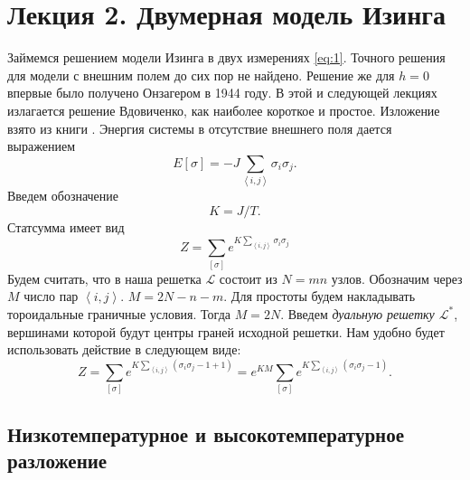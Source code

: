 \documentclass[a4paper,12pt]{article}
\theoremstyle{definition}
\theoremstyle{definition}
\theoremstyle{definition}
\begin{document}
\section{Лекция 2. Двумерная модель Изинга}
\label{sec:lecture-5}

Займемся решением модели Изинга в двух измерениях \eqref{eq:1}. Точного решения для модели с внешним
полем до сих пор не найдено. Решение же для $h=0$ впервые было получено Онзагером в 1944 году. В
этой и следующей лекциях излагается решение Вдовиченко, как наиболее короткое и простое. Изложение
взято из книги \cite{belavin2001lect}. 
Энергия системы в отсутствие внешнего поля дается выражением
\begin{equation}
  \label{eq:98}
  E[\sigma]=-J\sum_{\left<i,j\right>}\sigma_i \sigma_j .
\end{equation}
Введем обозначение
\begin{equation}
  \label{eq:99}
  K=J/T.
\end{equation}
Статсумма имеет вид
\begin{equation}
  \label{eq:100}
  Z=\sum_{[\sigma]}e^{K\sum_{\left<i,j\right>}\sigma_i\sigma_j}
\end{equation}
Будем считать, что в наша решетка $\mathcal{L}$ состоит из $N=mn$ узлов. Обозначим через $M$ число
пар $\left<i,j\right>$. $M=2N-n-m$. Для простоты будем накладывать тороидальные граничные условия.
Тогда $M=2N$. Введем {\it дуальную решетку $\mathcal{L}^*$}, вершинами которой будут центры граней
исходной решетки.  
Нам удобно будет использовать действие в следующем виде:
\begin{equation}
  \label{eq:101}
  Z=\sum_{[\sigma]}e^{K\sum_{\left<i,j\right>}(\sigma_i\sigma_j-1+1)}=e^{KM} \sum_{[\sigma]}e^{K\sum_{\left<i,j\right>}(\sigma_i\sigma_j-1)}.
\end{equation}

\subsection{Низкотемпературное и высокотемпературное разложение}
\label{sec:low-high-temp}
\end{document}
